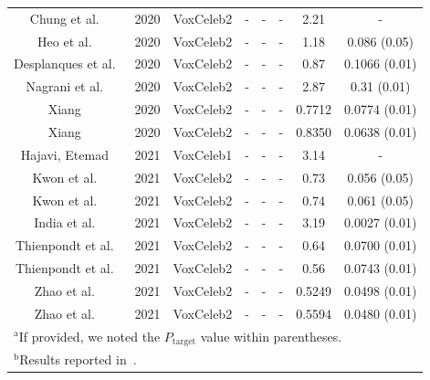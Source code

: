\documentclass[conference]{IEEEtran}
\begin{document}
\begin{table}[htbp]
\begin{center}
\begin{tabular}{|c|c|c|c|c|c|c|c|}
        Chung et al.~\cite{chung2020defence} & 2020 & VoxCeleb2 & - & - & - & 2.21 & - \\
        Heo et al.~\cite{heo2020clova} & 2020 & VoxCeleb2 & - & - & - & 1.18 & 0.086 (0.05) \\
        Desplanques et al.~\cite{desplanques2020ecapa} & 2020 & VoxCeleb2 & - & - & - & 0.87 & 0.1066 (0.01) \\
        Nagrani et al.~\cite{nagrani2020voxceleb} & 2020 & VoxCeleb2 & - & - & - & 2.87 & 0.31 (0.01) \\
        Xiang~\cite{xiang2020xx205} & 2020 & VoxCeleb2 & - & - & - & 0.7712 & 0.0774 (0.01) \\
        Xiang~\cite{xiang2020xx205} & 2020 & VoxCeleb2 & - & - & - & 0.8350 & 0.0638 (0.01) \\
        Hajavi, Etemad~\cite{hajavi2021siamese} & 2021 & VoxCeleb1 & - & - & - & 3.14 & - \\
        Kwon et al.~\cite{kwon2021ins} & 2021 & VoxCeleb2 & - & - & - & 0.73 & 0.056 (0.05)\\
        Kwon et al.~\cite{kwon2021ins} & 2021 & VoxCeleb2 & - & - & - & 0.74 & 0.061 (0.05)\\
        India et al.~\cite{india2021double} & 2021 & VoxCeleb2 & - & - & - & 3.19 & 0.0027 (0.01) \\
        Thienpondt et al.~\cite{thienpondt2021voxsrc} & 2021 & VoxCeleb2 & - & - & - & 0.64 & 0.0700 (0.01) \\
        Thienpondt et al.~\cite{thienpondt2021voxsrc} & 2021 & VoxCeleb2 & - & - & - & 0.56 & 0.0743 (0.01) \\
        Zhao et al.~\cite{zhao2021speakin} & 2021 & VoxCeleb2 & - & - & - & 0.5249 & 0.0498 (0.01) \\
        Zhao et al.~\cite{zhao2021speakin} & 2021 & VoxCeleb2 & - & - & - & 0.5594 & 0.0480 (0.01) \\
        \hline
        \multicolumn{8}{l}{$^{\mathrm{a}}$If provided, we noted the $P_{\text{target}}$ value within parentheses.} \\
        \multicolumn{8}{l}{$^{\mathrm{b}}$Results reported in~\cite{nagrani2020voxceleb}.}
        \end{tabular}
        \label{tab:results}
    \end{center}
\end{table}
\end{document}
